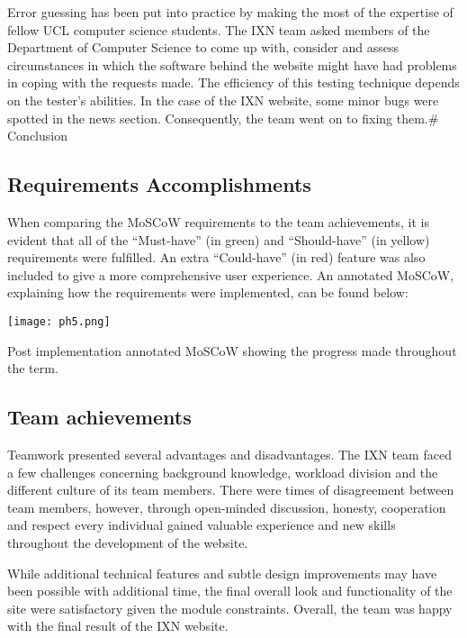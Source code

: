 \documentclass[fontsize=11pt]{extarticle}
\numberwithin{figure}{section} %
\begin{document}
Error guessing has been put into practice by making the most of the
expertise of fellow UCL computer science students. The IXN team asked
members of the Department of Computer Science to come up with, consider
and assess circumstances in which the software behind the website might
have had problems in coping with the requests made. The efficiency of
this testing technique depends on the tester's abilities. In the case of
the IXN website, some minor bugs were spotted in the news section.
Consequently, the team went on to fixing them.\# Conclusion

\hypertarget{requirements-accomplishments}{%
\subsection{Requirements
Accomplishments}\label{requirements-accomplishments}}

When comparing the MoSCoW requirements to the team achievements, it is
evident that all of the ``Must-have'' (in green) and ``Should-have'' (in
yellow) requirements were fulfilled. An extra ``Could-have'' (in red)
feature was also included to give a more comprehensive user experience.
An annotated MoSCoW, explaining how the requirements were implemented,
can be found below:

\begin{table}[H]
      \centering
      \texttt{[image: ph5.png]}
      \caption{Post implementation annotated MoSCoW showing the progress made throughout the term.}
 \end{table}

\hypertarget{team-achievements}{%
\subsection{Team achievements}\label{team-achievements}}

Teamwork presented several advantages and disadvantages. The IXN team
faced a few challenges concerning background knowledge, workload
division and the different culture of its team members. There were times
of disagreement between team members, however, through open-minded
discussion, honesty, cooperation and respect every individual gained
valuable experience and new skills throughout the development of the
website.

While additional technical features and subtle design improvements may
have been possible with additional time, the final overall look and
functionality of the site were satisfactory given the module
constraints. Overall, the team was happy with the final result of the
IXN website.
\end{document}
